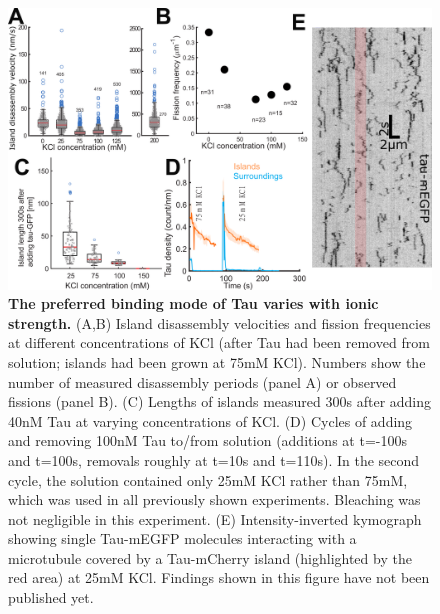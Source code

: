 \begin{figure}[h!]
	\centering
	\includegraphics[width=1\linewidth]{Figures/Tausalt.png}
	\caption[The preferred binding mode of Tau varies with ionic strength.]{
	\textbf{The preferred binding mode of Tau varies with ionic strength.} (A,B) Island disassembly velocities and fission frequencies at different concentrations of KCl (after Tau had been removed from solution; islands had been grown at 75mM KCl). Numbers show the number of measured disassembly periods (panel A) or observed fissions (panel B). (C) Lengths of islands measured 300s after adding 40nM Tau at varying concentrations of KCl. (D) Cycles of adding and removing 100nM Tau to/from solution (additions at t=-100s and t=100s, removals roughly at t=10s and t=110s). In the second cycle, the solution contained only 25mM KCl rather than 75mM, which was used in all previously shown experiments. Bleaching was not negligible in this experiment. (E) Intensity-inverted kymograph showing single Tau-mEGFP molecules interacting with a microtubule covered by a Tau-mCherry island (highlighted by the red area) at 25mM KCl. Findings shown in this figure have not been published yet.
		}\label{Tausalt}
\end{figure}

